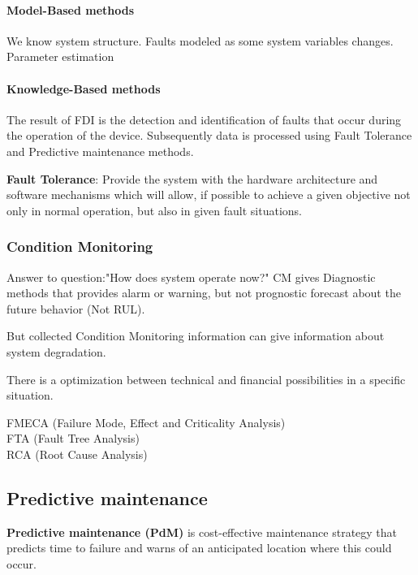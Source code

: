 \documentclass[class=article, crop=false]{standalone}
\begin{document}
\paragraph{Model-Based methods}
We know system structure. Faults modeled as some system variables changes.
Parameter estimation


\paragraph{Knowledge-Based methods}

The result of FDI is the detection and identification of faults that occur
during the operation of the device. Subsequently data is processed using
Fault Tolerance and Predictive maintenance methods.

\textbf{Fault Tolerance}: Provide the system with the hardware architecture and
  software mechanisms which will allow, if possible to achieve a given
  objective not only in normal operation, but also in given fault
  situations.


\subsubsection{Condition Monitoring}
Answer to question:"How does system operate now?"
CM gives Diagnostic methods that provides alarm or warning, but not
prognostic forecast about the future behavior (Not RUL).

But collected Condition Monitoring information can give information about
system degradation.


There is a optimization between technical and financial possibilities in a
specific situation.

FMECA (Failure Mode, Effect and Criticality Analysis) \\
FTA (Fault Tree Analysis) \\
RCA (Root Cause Analysis) \\


% 


\subsection{Predictive maintenance}
\textbf{Predictive maintenance (PdM)} is cost-effective maintenance strategy that
predicts time to failure and warns of an anticipated location where this
could occur.
\end{document}
